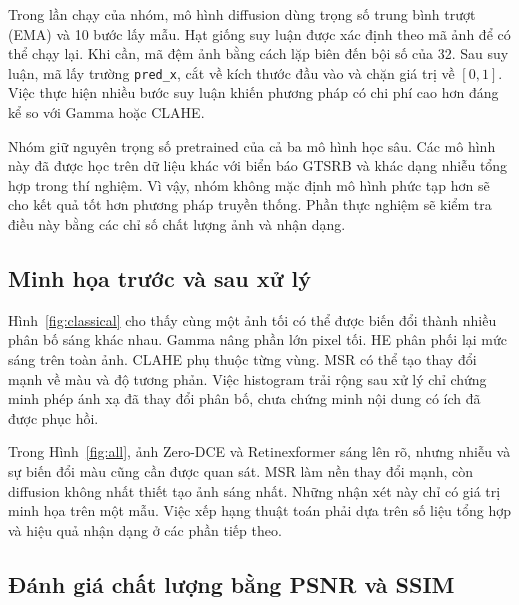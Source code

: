 Trong lần chạy của nhóm, mô hình diffusion dùng trọng số trung bình trượt (EMA) và 10 bước lấy mẫu. Hạt giống suy luận được xác định theo mã ảnh để có thể chạy lại. Khi cần, mã đệm ảnh bằng cách lặp biên đến bội số của 32. Sau suy luận, mã lấy trường \texttt{pred\_x}, cắt về kích thước đầu vào và chặn giá trị về $[0,1]$. Việc thực hiện nhiều bước suy luận khiến phương pháp có chi phí cao hơn đáng kể so với Gamma hoặc CLAHE.

Nhóm giữ nguyên trọng số pretrained của cả ba mô hình học sâu. Các mô hình này đã được học trên dữ liệu khác với biển báo GTSRB và khác dạng nhiễu tổng hợp trong thí nghiệm. Vì vậy, nhóm không mặc định mô hình phức tạp hơn sẽ cho kết quả tốt hơn phương pháp truyền thống. Phần thực nghiệm sẽ kiểm tra điều này bằng các chỉ số chất lượng ảnh và nhận dạng.

\subsection{Minh họa trước và sau xử lý}
Hình~\ref{fig:classical} cho thấy cùng một ảnh tối có thể được biến đổi thành nhiều phân bố sáng khác nhau. Gamma nâng phần lớn pixel tối. HE phân phối lại mức sáng trên toàn ảnh. CLAHE phụ thuộc từng vùng. MSR có thể tạo thay đổi mạnh về màu và độ tương phản. Việc histogram trải rộng sau xử lý chỉ chứng minh phép ánh xạ đã thay đổi phân bố, chưa chứng minh nội dung có ích đã được phục hồi.

Trong Hình~\ref{fig:all}, ảnh Zero-DCE và Retinexformer sáng lên rõ, nhưng nhiễu và sự biến đổi màu cũng cần được quan sát. MSR làm nền thay đổi mạnh, còn diffusion không nhất thiết tạo ảnh sáng nhất. Những nhận xét này chỉ có giá trị minh họa trên một mẫu. Việc xếp hạng thuật toán phải dựa trên số liệu tổng hợp và hiệu quả nhận dạng ở các phần tiếp theo.

\subsection{Đánh giá chất lượng bằng PSNR và SSIM}
